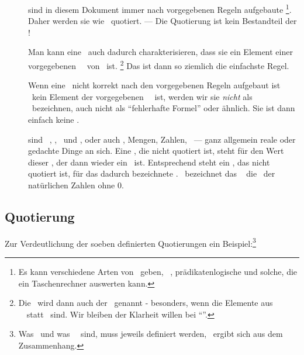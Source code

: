 \begin{description}
	\item [\Formeln] \label{def-Formel} sind in diesem Dokument immer nach vorgegebenen Regeln aufgebaute \Zeichenfolgen%
	\footnote{%
		Es kann verschiedene Arten von \Formeln\ geben, \textzB\ \aussagenlogischeF, prädikatenlogische und solche, die ein Taschenrechner auswerten kann.
	}.
	Daher werden sie wie \Zeichenfolgen\ quotiert.
	--- Die Quotierung ist kein Bestandteil der \Zeichenfolge!

	Man kann eine \Formel\ auch dadurch charakterisieren, dass sie ein Element einer vorgegebenen \Menge\ \MtsSprache\ von \Zeichenfolgen\ ist.%
	\footnote{%
		Die \Formel\ wird dann auch  der  \MtsSprache\ genannt - besonders, wenn die Elemente aus \MtsSprache\ \Zeichenketten\ statt \Zeichenfolgen\ sind.
		Wir bleiben der Klarheit willen bei "`\Formel"'.
	}
	Das ist dann so ziemlich die einfachste Regel.

	Wenn eine \Zeichenfolge\ nicht korrekt nach den vorgegebenen Regeln aufgebaut ist \textbzw\ kein Element der vorgegebenen \Menge\ \MtsSprache\ ist, werden wir sie \emph{nicht} als \Formel\ bezeichnen, auch nicht als "`fehlerhafte Formel"' oder ähnlich.
	Sie ist dann einfach keine \Formel.

	\item [\Objekte] sind \textzB\ \Symbole, \Zeichenketten, \Zeichenfolgen\ und \Formeln, oder auch \Aussagen, Mengen, Zahlen, \textusw\ --- ganz allgemein reale oder gedachte Dinge an sich.
	Eine \Formel, die nicht quotiert ist, steht für den Wert dieser \Formel, der dann wieder ein \Objekt\ ist.
	Entsprechend steht ein \Symbol, das nicht quotiert ist, für das dadurch bezeichnete \Objekt.
	\textZB\ bezeichnet das \Symbol\ \chrqt{\MtsIN} die \Menge\ \MtsIN der natürlichen Zahlen ohne 0.

\end{description}

\subsection{Quotierung}%
\label {sub-Quotierung}

Zur Verdeutlichung der soeben definierten Quotierungen ein Beispiel:\footnote{%
	Was \atomare\ und was \zerlegbare\ \Symbole\ sind, muss jeweils definiert werden, \textbzw\ ergibt sich aus dem Zusammenhang.
}

